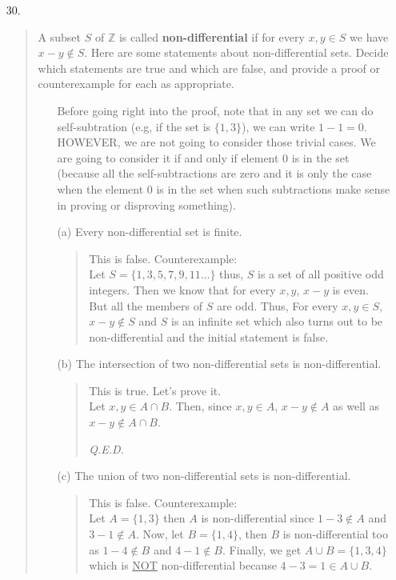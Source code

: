 \documentclass[12pt, a4paper]{article}                      %
\begin{document}
\begin{enumerate}
\item[30.]
\begin{quote}
A subset $S$ of $\mathbb{Z}$ is called \textbf{non-differential} if for every $x, y \in S$ we have
$x - y \notin S$. Here are some statements about non-differential sets. Decide which statements are
true and which are false, and provide a proof or counterexample for each as appropriate.
\begin{itemize}
\item[]
Before going right into the proof, note that in any set we can do self-subtration
(e.g, if the set is $\{1, 3\}$), we can write $1 - 1 = 0$. HOWEVER, we are not going
to consider those trivial cases. We are going to consider it if and only if element
0 is in the set (because all the self-subtractions are zero and it is only the case when
the element 0 is in the set when such subtractions make sense in proving or disproving something).
\item[(a)]
Every non-differential set is finite.
\begin{quote}
This is false. Counterexample:\\
Let $S = \{1,3,5,7,9,11...\}$ thus, $S$ is a set of all positive odd integers.
Then we know that for every $x, y$, $x - y$ is even. But all the members of $S$
are odd. Thus, For every $x,y \in S$, $x - y \notin S$ and $S$ is an infinite set
which also turns out to be non-differential and the initial statement is false.
\end{quote}
\item[(b)]
The intersection of two non-differential sets is non-differential.
\begin{quote}
This is true. Let's prove it.\\
Let $x, y \in A \cap B$. Then, since $x, y \in A$, $x - y \notin A$ as well as $x - y \notin A \cap B$. 
\begin{flushright}
\textit{Q.E.D.}
\end{flushright}
\end{quote}
\item[(c)]
The union of two non-differential sets is non-differential.
\begin{quote}
This is false. Counterexample:\\
Let $A = \{1, 3\}$ then $A$ is non-differential since $1 - 3  \notin A$
and $3 - 1 \notin A$. Now, let $B = \{1, 4\}$, then $B$ is non-differential too
as $1 - 4 \notin B$ and $4 - 1 \notin B$. Finally, we get $A \cup B = \{1, 3, 4\}$
which is \underline{NOT} non-differential because $4 - 3 = 1 \in A \cup B$.

\end{quote}
\end{itemize}
\end{quote}
\end{enumerate}
\end{document}
